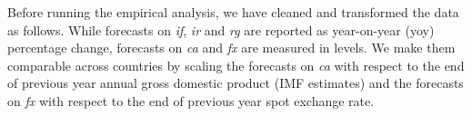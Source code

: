 
Before running the empirical analysis, we have cleaned and transformed the data as follows. %
While forecasts on \emph{if}, \emph{ir} and \emph{rg} are reported as year-on-year (yoy) percentage change, forecasts on \emph{ca} and \emph{fx} are measured in levels. We make them comparable across countries by scaling the forecasts on \emph{ca} with respect to the end of previous year annual gross domestic product (IMF estimates) and the forecasts on \emph{fx} with respect to the end of previous year spot exchange rate.

